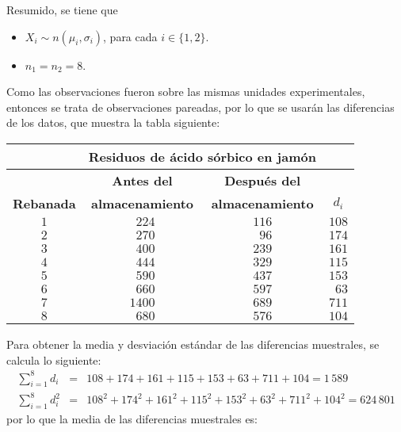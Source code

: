\begin{solucion}
 \begin{datos}
  Resumido, se tiene que
  \begin{itemize}
   \item $X_i \sim n\left( \mu_i, \sigma_i \right)$,
   para cada $i \in \{ 1, 2 \}$.
   \item $n_1 = n_2 = 8$.
  \end{itemize}
  Como las observaciones fueron sobre las mismas unidades
  experimentales, entonces se trata de observaciones pareadas,
  por lo que se usar\'an las diferencias de los datos,
  que muestra la tabla siguiente:
  \begin{center}
   \begin{tabular}{cccc}
    & \multicolumn{2}{c}{\textbf{Residuos de \'acido
    s\'orbico en jam\'on}} & \\
    \hline 
    & \textbf{Antes del} & \textbf{Despu\'es del} & \\
    \textbf{Rebanada} & \textbf{almacenamiento} &
    \textbf{almacenamiento} & \hspace{1cm} $d_i$ \hspace{1cm} \\
    \hline 
    $1$ & $\phantom{1}224$ & $116$ & $108$ \\
    $2$ & $\phantom{1}270$ & $\phantom{1}96$ & $174$\\
    $3$ & $\phantom{1}400$ & $239$ & $161$ \\
    $4$ & $\phantom{1}444$ & $329$ & $115$ \\
    $5$ & $\phantom{1}590$ & $437$ & $153$ \\
    $6$ & $\phantom{1}660$ & $597$ & $\phantom{1}63$ \\
    $7$ & $1400$ & $689$ & $711$ \\
    $8$ & $\phantom{1}680$ & $576$ & $104$ \\
   \end{tabular}
  \end{center}
  Para obtener la media y desviaci\'on est\'andar
  de las diferencias muestrales, se calcula lo siguiente:
  \begin{eqnarray*}
   \sum_{i=1}^8 d_i & = &
   108 + 174 + 161 + 115 + 153 + 63 + 711 + 104 = 1\,589 \\
   \sum_{i=1}^8 d_i^2 & = & 
   108^2 + 174^2 + 161^2 + 115^2 + 153^2 + 63^2 + 711^2 + 104^2
   = 624\,801
  \end{eqnarray*}
  por lo que la media de las diferencias muestrales es:
  \begin{equation*}

\end{equation*}
\end{datos}
\end{solucion}

